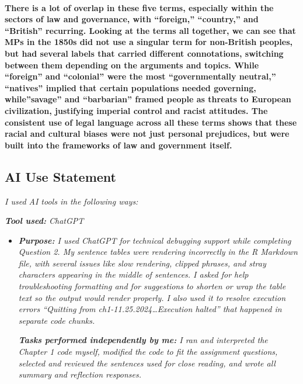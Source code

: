 \documentclass[
]{article}
\begin{document}
\paragraph{There is a lot of overlap in these five terms, especially
within the sectors of law and governance, with ``foreign,'' ``country,''
and ``British'' recurring. Looking at the terms all together, we can see
that MPs in the 1850s did not use a singular term for non-British
peoples, but had several labels that carried different connotations,
switching between them depending on the arguments and topics. While
``foreign'' and ``colonial'' were the most ``governmentally neutral,''
``natives'' implied that certain populations needed governing,
while''savage'' and ``barbarian'' framed people as threats to European
civilization, justifying imperial control and racist attitudes. The
consistent use of legal language across all these terms shows that these
racial and cultural biases were not just personal prejudices, but were
built into the frameworks of law and government
itself.}\label{there-is-a-lot-of-overlap-in-these-five-terms-especially-within-the-sectors-of-law-and-governance-with-foreign-country-and-british-recurring.-looking-at-the-terms-all-together-we-can-see-that-mps-in-the-1850s-did-not-use-a-singular-term-for-non-british-peoples-but-had-several-labels-that-carried-different-connotations-switching-between-them-depending-on-the-arguments-and-topics.-while-foreign-and-colonial-were-the-most-governmentally-neutral-natives-implied-that-certain-populations-needed-governing-whilesavage-and-barbarian-framed-people-as-threats-to-european-civilization-justifying-imperial-control-and-racist-attitudes.-the-consistent-use-of-legal-language-across-all-these-terms-shows-that-these-racial-and-cultural-biases-were-not-just-personal-prejudices-but-were-built-into-the-frameworks-of-law-and-government-itself.}

\subsection{AI Use Statement}\label{ai-use-statement}

\emph{I used AI tools in the following ways:}

\emph{\textbf{Tool used:} ChatGPT}

\begin{itemize}
\item
  \emph{\textbf{Purpose:} I used ChatGPT for technical debugging support
  while completing Question 2. My sentence tables were rendering
  incorrectly in the R Markdown file, with several issues like slow
  rendering, clipped phrases, and stray characters appearing in the
  middle of sentences. I asked for help troubleshooting formatting and
  for suggestions to shorten or wrap the table text so the output would
  render properly. I also used it to resolve execution errors ``Quitting
  from ch1-11.25.2024\ldots Execution halted'' that happened in separate
  code chunks.}

  \emph{\textbf{Tasks performed independently by me:} I ran and
  interpreted the Chapter 1 code myself, modified the code to fit the
  assignment questions, selected and reviewed the sentences used for
  close reading, and wrote all summary and reflection responses.}
\end{itemize}
\end{document}
